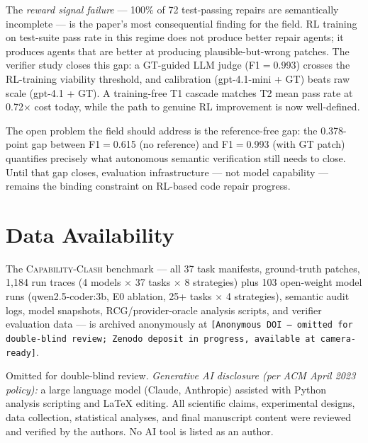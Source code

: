\documentclass[sigconf,review,anonymous]{acmart}
\newcommand{\ccbench}{\textsc{Capability-Clash}}
\begin{document}
The \emph{reward signal failure} — 100\% of 72 test-passing repairs are semantically incomplete — is the paper's most consequential finding for the field. RL training on test-suite pass rate in this regime does not produce better repair agents; it produces agents that are better at producing plausible-but-wrong patches. The verifier study closes this gap: a GT-guided LLM judge (F1$=$0.993) crosses the RL-training viability threshold, and calibration (gpt-4.1-mini + GT) beats raw scale (gpt-4.1 + GT). A training-free T1 cascade matches T2 mean pass rate at 0.72$\times$ cost today, while the path to genuine RL improvement is now well-defined.

The open problem the field should address is the reference-free gap: the 0.378-point gap between F1$=$0.615 (no reference) and F1$=$0.993 (with GT patch) quantifies precisely what autonomous semantic verification still needs to close. Until that gap closes, evaluation infrastructure — not model capability — remains the binding constraint on RL-based code repair progress.

\section*{Data Availability}

The \ccbench{} benchmark — all 37 task manifests, ground-truth patches, 1{,}184 run traces (4 models $\times$ 37 tasks $\times$ 8 strategies) plus 103 open-weight model runs (qwen2.5-coder:3b, E0 ablation, 25+ tasks $\times$ 4 strategies), semantic audit logs, model snapshots, RCG/provider-oracle analysis scripts, and verifier evaluation data — is archived anonymously at \texttt{[Anonymous DOI — omitted for double-blind review; Zenodo deposit in progress, available at camera-ready]}.

\begin{acks}
Omitted for double-blind review. \textit{Generative AI disclosure (per ACM April 2023 policy):} a large language model (Claude, Anthropic) assisted with Python analysis scripting and LaTeX editing. All scientific claims, experimental designs, data collection, statistical analyses, and final manuscript content were reviewed and verified by the authors. No AI tool is listed as an author.
\end{acks}



\end{document}

